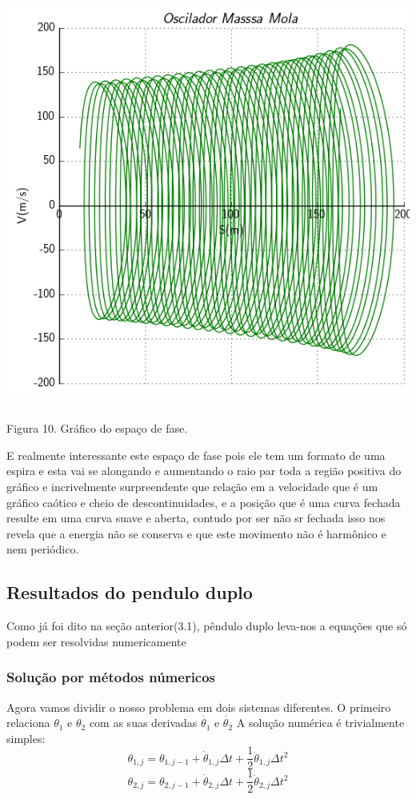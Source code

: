 \documentclass[a4paper]{article} %
\begin{document}
\begin{center}
	\includegraphics[width=5.58in,height=5.36in, keepaspectratio=false]{penMassaMolaXV.png}
	
	\scriptsize {Figura 10. Gráfico do espaço de fase.}
\end{center}

E realmente interessante este espaço de fase pois ele tem um formato de uma espira e esta vai se alongando e aumentando o raio par toda a região positiva do gráfico e incrivelmente surpreendente que relação em a velocidade que é um gráfico caótico e cheio de descontinuidades, e a posição que é uma curva fechada resulte em uma curva suave e aberta, contudo por ser não sr fechada isso nos revela que a energia não se conserva e que este movimento não é harmônico e nem periódico.    

\subsection{Resultados do pendulo duplo}

Como j\'{a} foi dito na se\c{c}\~{a}o anterior(3.1), p\^{e}ndulo duplo leva-nos a equa\c{c}\~{o}es que s\'{o} podem ser resolvidas numericamente

\subsubsection{Solu\c{c}\~{a}o por m\'{e}todos n\'{u}mericos}
Agora vamos dividir o nosso problema em dois sistemas diferentes. O primeiro relaciona $\theta_1$
e $\theta_2$ com as suas derivadas $\dot{\theta_1}$ e $\dot{\theta_2}$ A solu\c{c}\~{a}o num\'{e}rica \'{e} trivialmente simples:
\[\theta_{1,j} = \theta_{1,j-1} + \dot{\theta}_{1,j}\Delta{t} + \frac{1}{2}\ddot{\theta}_{1,j}\Delta{t}^2 \]
\[\theta_{2,j} = \theta_{2,j-1} + \dot{\theta}_{2,j}\Delta{t} + \frac{1}{2}\ddot{\theta}_{2,j}\Delta{t}^2 \]
\end{document}
